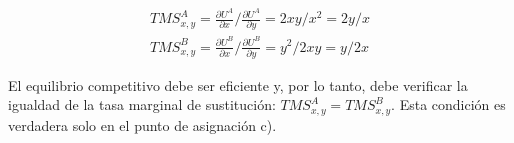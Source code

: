 \begin{gather*}
	TMS_{x,y}^A =\frac{\partial U^A}{\partial x}/\frac{\partial U^A}{\partial y} = 2xy/x^2=2y/x\\
	TMS_{x,y}^B =\frac{\partial U^B}{\partial x}/\frac{\partial U^B}{\partial y} = y^2/2xy = y/2x
\end{gather*}

El equilibrio competitivo debe ser eficiente y, por lo tanto, debe verificar la igualdad de la tasa marginal de sustitución: $TMS_{x,y}^A = TMS_{x,y}^B$. Esta condición es verdadera solo en el punto de asignación c).